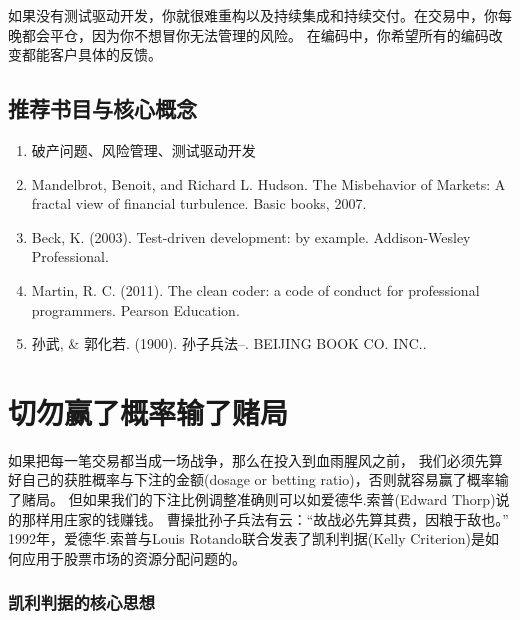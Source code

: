 \documentclass[
  oneside]{book}
\providecommand{\tightlist}{%
  \setlength{\itemsep}{0pt}\setlength{\parskip}{0pt}}
\begin{document}
如果没有测试驱动开发，你就很难重构以及持续集成和持续交付。在交易中，你每晚都会平仓，因为你不想冒你无法管理的风险。
在编码中，你希望所有的编码改变都能客户具体的反馈。

\hypertarget{ux63a8ux8350ux4e66ux76eeux4e0eux6838ux5fc3ux6982ux5ff5}{%
\section{推荐书目与核心概念}\label{ux63a8ux8350ux4e66ux76eeux4e0eux6838ux5fc3ux6982ux5ff5}}

\begin{enumerate}
\def\labelenumi{\arabic{enumi}.}
\tightlist
\item
  破产问题、风险管理、测试驱动开发
\item
  Mandelbrot, Benoit, and Richard L. Hudson. The Misbehavior of Markets: A fractal view of financial turbulence. Basic books, 2007.
\item
  Beck, K. (2003). Test-driven development: by example. Addison-Wesley Professional.
\item
  Martin, R. C. (2011). The clean coder: a code of conduct for professional programmers. Pearson Education.
\item
  孙武, \& 郭化若. (1900). 孙子兵法--. BEIJING BOOK CO. INC..
\end{enumerate}

\hypertarget{ux5207ux52ffux8d62ux4e86ux6982ux7387ux8f93ux4e86ux8d4cux5c40}{%
\chapter{切勿赢了概率输了赌局}\label{ux5207ux52ffux8d62ux4e86ux6982ux7387ux8f93ux4e86ux8d4cux5c40}}

如果把每一笔交易都当成一场战争，那么在投入到血雨腥风之前，
我们必须先算好自己的获胜概率与下注的金额(dosage or betting ratio)，否则就容易赢了概率输了赌局。
但如果我们的下注比例调整准确则可以如爱德华.索普(Edward Thorp)说的那样用庄家的钱赚钱。
曹操批孙子兵法有云：``故战必先算其费，因粮于敌也。''
1992年，爱德华.索普与Louis Rotando联合发表了凯利判据(Kelly Criterion)是如何应用于股票市场的资源分配问题的。

\hypertarget{ux51efux5229ux5224ux636eux7684ux6838ux5fc3ux601dux60f3}{%
\subsection{凯利判据的核心思想}\label{ux51efux5229ux5224ux636eux7684ux6838ux5fc3ux601dux60f3}}
\end{document}
